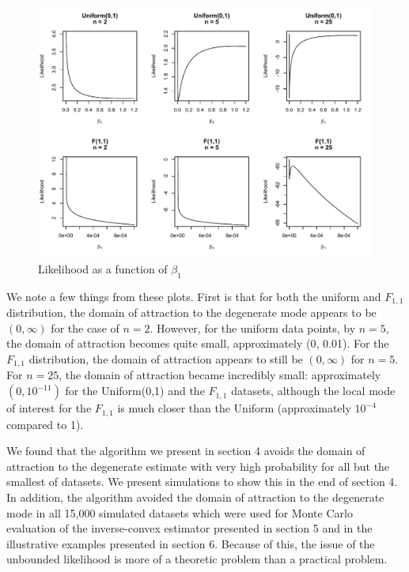 \documentclass[11pt]{article}
\numberwithin{equation}{section}
\begin{document}
	\begin{figure}[H]
	\centerline{\includegraphics[width = 15cm]{DomainA.pdf} }
	\caption{Likelihood as a function of $\beta_1$}
	\end{figure} 
	
	We note a few things from these plots. First is that for both the uniform and $F_{1,1}$ distribution, the domain of attraction to the degenerate mode appears to be $(0, \infty)$ for the case of $n= 2$. However, for the uniform data points, by $n = 5$, the domain of attraction becomes quite small, approximately (0, 0.01). For the $F_{1,1}$ distribution, the domain of attraction appears to still be $(0, \infty)$ for $n = 5$. For $n = 25$, the domain of attraction became incredibly small: approximately $(0, 10^{-11})$ for the Uniform(0,1) and the $F_{1,1}$ datasets, although the local mode of interest for the $F_{1,1}$ is much closer than the Uniform (approximately $10^{-4}$ compared to 1). 
	
	We found that the algorithm we present in section 4 avoids the domain of attraction to the degenerate estimate with very high probability for all but the smallest of datasets. We present simulations to show this in the end of section 4. In addition, the algorithm avoided the domain of attraction to the degenerate mode in all 15,000 simulated datasets which were used for Monte Carlo evaluation of the inverse-convex estimator presented in section 5 and in the illustrative examples presented in section 6. Because of this, the issue of the unbounded likelihood is more of a theoretic problem than a practical problem. 
	
\end{document}

